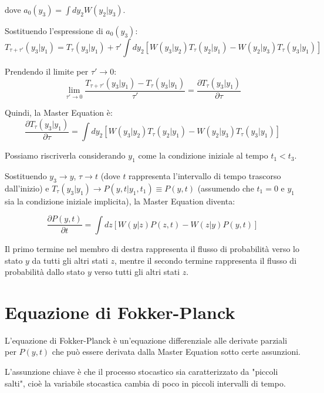 dove $a_0(y_3) = \int dy_2 W(y_2 | y_3)$.

Sostituendo l'espressione di $a_0(y_3)$:
\begin{equation*}
T_{\tau+\tau'}(y_3 | y_1) = T_{\tau}(y_3 | y_1) + \tau' \int dy_2 [W(y_3 | y_2) T_{\tau}(y_2 | y_1) - W(y_2 | y_3) T_{\tau}(y_3 | y_1)]
\end{equation*}


Prendendo il limite per $\tau' \rightarrow 0$:
\begin{equation}
\lim_{\tau' \rightarrow 0} \frac{T_{\tau+\tau'}(y_3 | y_1) - T_{\tau}(y_3 | y_1)}{\tau'} = \frac{\partial T_{\tau}(y_3 | y_1)}{\partial \tau}
\end{equation}


Quindi, la Master Equation è:
\begin{equation}
\frac{\partial T_{\tau}(y_3 | y_1)}{\partial \tau} = \int dy_2 [W(y_3 | y_2) T_{\tau}(y_2 | y_1) - W(y_2 | y_3) T_{\tau}(y_3 | y_1)]
\end{equation}

Possiamo riscriverla considerando $y_1$ come la condizione iniziale al tempo $t_1 < t_3$. 

Sostituendo $y_3 \rightarrow y$, $\tau \rightarrow t$ (dove $t$ rappresenta l'intervallo di tempo trascorso dall'inizio) e $T_{\tau}(y_3 | y_1) \rightarrow P(y,t | y_1, t_1) \equiv P(y,t)$ (assumendo che $t_1=0$ e $y_1$ sia la condizione iniziale implicita), la Master Equation diventa:


\begin{equation}
\frac{\partial P(y,t)}{\partial t} = \int dz [W(y | z) P(z,t) - W(z | y) P(y,t)]
\end{equation}




Il primo termine nel membro di destra rappresenta il flusso di probabilità verso lo stato $y$ da tutti gli altri stati $z$, mentre il secondo termine rappresenta il flusso di probabilità dallo stato $y$ verso tutti gli altri stati $z$.

\section{Equazione di Fokker-Planck}

L'equazione di Fokker-Planck è un'equazione differenziale alle derivate parziali per $P(y,t)$ che può essere derivata dalla Master Equation sotto certe assunzioni.

L'assunzione chiave è che il processo stocastico sia caratterizzato da "piccoli salti", cioè la variabile stocastica cambia di poco in piccoli intervalli di tempo. 

